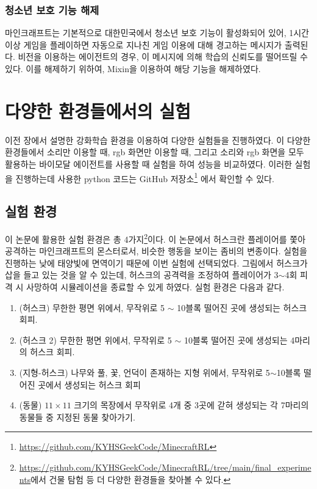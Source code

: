 \documentclass[oneside, under, ko]{snuthesis}
\begin{document}
\subsection{청소년 보호 기능 해제}
마인크래프트는 기본적으로 대한민국에서 청소년 보호 기능이 활성화되어 있어, 1시간 이상 게임을 플레이하면 자동으로 지나친 게임 이용에 대해 경고하는 메시지가 출력된다. 비전을 이용하는 에이전트의 경우, 이 메시지에 의해 학습의 신뢰도를 떨어뜨릴 수 있다. 이를 해제하기 위하여, Mixin을 이용하여 해당 기능을 해제하였다.


\chapter{다양한 환경들에서의 실험}
이전 장에서 설명한 강화학습 환경을 이용하여 다양한 실험들을 진행하였다. 이 다양한 환경들에서 소리만 이용할 때, rgb 화면만 이용할 때, 그리고 소리와 rgb 화면을 모두 활용하는 바이모달 에이전트를 사용할 때 실험을 하여 성능을 비교하였다. 이러한 실험을 진행하는데 사용한 python 코드는 GitHub 저장소\footnote{\url{https://github.com/KYHSGeekCode/MinecraftRL}} 에서 확인할 수 있다.

\section{실험 환경}
이 논문에 활용한 실험 환경은 총 4가지\footnote{\url{https://github.com/KYHSGeekCode/MinecraftRL/tree/main/final_experiments}에서 건물 탐험 등 더 다양한 환경들을 찾아볼 수 있다.}이다. 이 논문에서 허스크란 플레이어를 쫓아 공격하는 마인크래프트의 몬스터로서, 비슷한 행동을 보이는 좀비의 변종이다. 실험을 진행하는 낮에 태양빛에 면역이기 때문에 이번 실험에 선택되었다. 그림에서 허스크가 삽을 들고 있는 것을 알 수 있는데, 허스크의 공격력을 조정하여 플레이어가 3$\sim$4회 피격 시 사망하여 시뮬레이션을 종료할 수 있게 하였다. 실험 환경은 다음과 같다.
\begin{enumerate}
    \item (허스크) 무한한 평면 위에서, 무작위로 5 $\sim$ 10블록 떨어진 곳에 생성되는 허스크 회피.
    \item (허스크 2) 무한한 평면 위에서, 무작위로 5 $\sim$ 10블록 떨어진 곳에 생성되는 4마리의 허스크 회피.
    \item (지형-허스크) 나무와 풀, 꽃, 언덕이 존재하는 지형 위에서, 무작위로 5$\sim$10블록 떨어진 곳에서 생성되는 허스크 회피
    \item (동물) $11 \times 11$ 크기의 목장에서 무작위로 4개 중 3곳에 갇혀 생성되는 각 7마리의 동물들 중 지정된 동물 찾아가기.
\end{enumerate}
\end{document}
